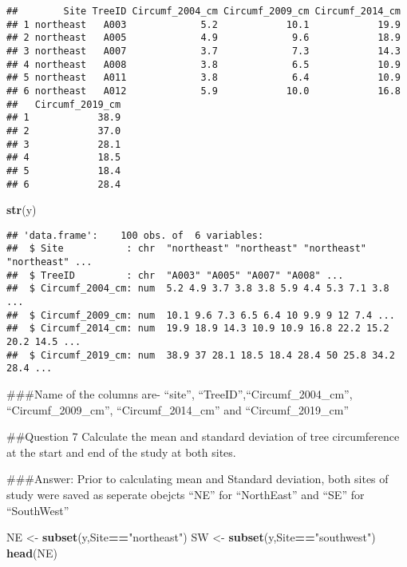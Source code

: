 \documentclass[]{article}
\newenvironment{Shaded}{\begin{snugshade}}{\end{snugshade}}
\newcommand{\KeywordTok}[1]{\textcolor[rgb]{0.13,0.29,0.53}{\textbf{#1}}}
\newcommand{\NormalTok}[1]{#1}
\newcommand{\OperatorTok}[1]{\textcolor[rgb]{0.81,0.36,0.00}{\textbf{#1}}}
\newcommand{\StringTok}[1]{\textcolor[rgb]{0.31,0.60,0.02}{#1}}
\begin{document}
\begin{verbatim}
##        Site TreeID Circumf_2004_cm Circumf_2009_cm Circumf_2014_cm
## 1 northeast   A003             5.2            10.1            19.9
## 2 northeast   A005             4.9             9.6            18.9
## 3 northeast   A007             3.7             7.3            14.3
## 4 northeast   A008             3.8             6.5            10.9
## 5 northeast   A011             3.8             6.4            10.9
## 6 northeast   A012             5.9            10.0            16.8
##   Circumf_2019_cm
## 1            38.9
## 2            37.0
## 3            28.1
## 4            18.5
## 5            18.4
## 6            28.4
\end{verbatim}

\begin{Shaded}
\begin{Highlighting}[]
\KeywordTok{str}\NormalTok{(y)}
\end{Highlighting}
\end{Shaded}

\begin{verbatim}
## 'data.frame':    100 obs. of  6 variables:
##  $ Site           : chr  "northeast" "northeast" "northeast" "northeast" ...
##  $ TreeID         : chr  "A003" "A005" "A007" "A008" ...
##  $ Circumf_2004_cm: num  5.2 4.9 3.7 3.8 3.8 5.9 4.4 5.3 7.1 3.8 ...
##  $ Circumf_2009_cm: num  10.1 9.6 7.3 6.5 6.4 10 9.9 9 12 7.4 ...
##  $ Circumf_2014_cm: num  19.9 18.9 14.3 10.9 10.9 16.8 22.2 15.2 20.2 14.5 ...
##  $ Circumf_2019_cm: num  38.9 37 28.1 18.5 18.4 28.4 50 25.8 34.2 28.4 ...
\end{verbatim}

\#\#\#Name of the columns are- ``site'',
``TreeID'',``Circumf\_2004\_cm'', ``Circumf\_2009\_cm'',
``Circumf\_2014\_cm'' and ``Circumf\_2019\_cm''

\#\#Question 7 Calculate the mean and standard deviation of tree
circumference at the start and end of the study at both sites.

\#\#\#Answer: Prior to calculating mean and Standard deviation, both
sites of study were saved as seperate obejcts ``NE'' for ``NorthEast''
and ``SE'' for ``SouthWest''

\begin{Shaded}
\begin{Highlighting}[]
\NormalTok{NE <-}\StringTok{ }\KeywordTok{subset}\NormalTok{(y,Site}\OperatorTok{==}\StringTok{"northeast"}\NormalTok{)}
\NormalTok{SW <-}\StringTok{ }\KeywordTok{subset}\NormalTok{(y,Site}\OperatorTok{==}\StringTok{"southwest"}\NormalTok{)}
\KeywordTok{head}\NormalTok{(NE)}
\end{Highlighting}
\end{Shaded}
\end{document}
